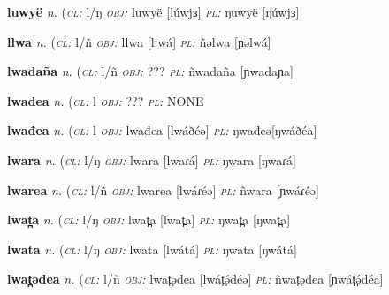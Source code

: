 {\newentry
\headword\textbf{luwyë} 
\ipa{[lúwjɜ]}
\synpos\textit{n.} 
\class(\textit{\textsc{cl:}} {l/ŋ}
\object\textit{\textsc{obj:}} luwyë [lúwjɜ]
\plural\textit{\textsc{pl:}} ŋuwyë [ŋúwjɜ]

\newentry
\headword\textbf{llwa} 
\ipa{[lːwá]}
\synpos\textit{n.} 
\class(\textit{\textsc{cl:}} {l/ñ}
\object\textit{\textsc{obj:}} llwa [lːwá]
\plural\textit{\textsc{pl:}} ñəlwa [ɲəlwá]

\newentry
\headword\textbf{lwadaña} 
\ipa{[lwadaɲa]}
\synpos\textit{n.} 
\class(\textit{\textsc{cl:}} {l/ñ}
\object\textit{\textsc{obj:}} ???
\plural\textit{\textsc{pl:}} ñwadaña [ɲwadaɲa]

\newentry
\headword\textbf{lwadea} 
\ipa{[lwadeə]}
\synpos\textit{n.} 
\class(\textit{\textsc{cl:}} {l}
\object\textit{\textsc{obj:}} ???
\plural\textit{\textsc{pl:}} NONE

\newentry
\headword\textbf{lwađea} 
\ipa{[lwáðéə]}
\synpos\textit{n.} 
\class(\textit{\textsc{cl:}} {l}
\object\textit{\textsc{obj:}} lwađea [lwáðéə]
\plural\textit{\textsc{pl:}} ŋwađeə[ŋwáðéa]

\newentry
\headword\textbf{lwara} 
\ipa{[lwaɾá]}
\synpos\textit{n.} 
\class(\textit{\textsc{cl:}} {l/ŋ}
\object\textit{\textsc{obj:}} lwara [lwaɾá]
\plural\textit{\textsc{pl:}} ŋwara [ŋwaɾá]

\newentry
\headword\textbf{lwarea} 
\ipa{[lwáɾéə]}
\synpos\textit{n.} 
\class(\textit{\textsc{cl:}} {l/ñ}
\object\textit{\textsc{obj:}} lwarea [lwáɾéə]
\plural\textit{\textsc{pl:}} ñwara [ɲwáɾéə]


\newentry
\headword\textbf{lwat̪a} 
\ipa{[lwat̪a]}
\synpos\textit{n.} 
\class(\textit{\textsc{cl:}} {l/ŋ}
\object\textit{\textsc{obj:}} lwat̪a [lwat̪a]
\plural\textit{\textsc{pl:}} ŋwat̪a [ŋwat̪a]

\newentry
\headword\textbf{lwata} 
\ipa{[lwátá]}
\synpos\textit{n.} 
\class(\textit{\textsc{cl:}} {l/ŋ}
\object\textit{\textsc{obj:}} lwata [lwátá]
\plural\textit{\textsc{pl:}} ŋwata [ŋwátá]

\newentry
\headword\textbf{lwat̪ədea} 
\ipa{[lwát̪ə́déə]}
\synpos\textit{n.} 
\class(\textit{\textsc{cl:}} {l/ñ}
\object\textit{\textsc{obj:}} lwat̪ədea [lwát̪ə́déə]
\plural\textit{\textsc{pl:}} ñwat̪ədea [ɲwát̪ə́déa]

}
